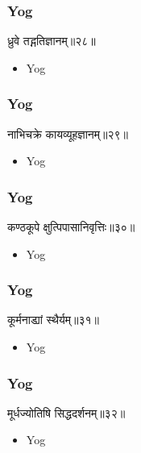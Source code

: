 \begin{frame}[fragile]\frametitle{Yog}
\begin{sanskrit}
ध्रुवे तद्गतिज्ञानम्॥२८॥
\end{sanskrit}
	\begin{itemize}
	\item Yog 
	\end{itemize}
\end{frame}


\begin{frame}[fragile]\frametitle{Yog}
\begin{sanskrit}
नाभिचक्रे कायव्यूहज्ञानम्॥२९॥
\end{sanskrit}
	\begin{itemize}
	\item Yog 
	\end{itemize}
\end{frame}

\begin{frame}[fragile]\frametitle{Yog}
\begin{sanskrit}
कण्ठकूपे क्षुत्पिपासानिवृत्तिः॥३०॥
\end{sanskrit}
	\begin{itemize}
	\item Yog 
	\end{itemize}
\end{frame}


\begin{frame}[fragile]\frametitle{Yog}
\begin{sanskrit}
कूर्मनाड्यां स्थैर्यम्॥३१॥
\end{sanskrit}
	\begin{itemize}
	\item Yog 
	\end{itemize}
\end{frame}


\begin{frame}[fragile]\frametitle{Yog}
\begin{sanskrit}
मूर्धज्योतिषि सिद्धदर्शनम्॥३२॥
\end{sanskrit}
	\begin{itemize}
	\item Yog 
	\end{itemize}
\end{frame}

